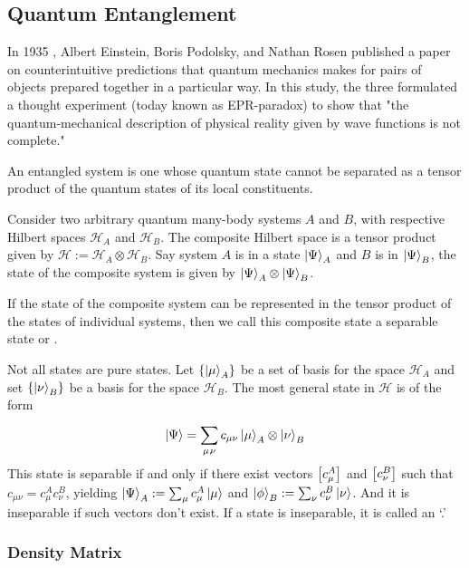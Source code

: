 \documentclass[11pt, oneside]{scrbook}
\renewcommand{\H}{\mathcal{H}}
\begin{document}
\subsection{Quantum Entanglement}

In 1935 \cite{Einstein1935}, Albert Einstein, Boris Podolsky, and Nathan Rosen published a paper on counterintuitive predictions that quantum mechanics makes for pairs of objects prepared together in a particular way. In this study, the three formulated a thought experiment (today known as EPR-paradox) to show that "the quantum-mechanical description of physical reality given by wave functions is not complete."

\begin{definition}
    An entangled system is one whose quantum state cannot be separated as a tensor product of the quantum states of its local constituents.
\end{definition}

Consider two arbitrary quantum many-body systems $A$ and $B$, with respective Hilbert spaces \(\H_{A}\) and \(\H_{B}\). The composite Hilbert space is a tensor product given by \(\H:= \H_{A} \otimes \H_{B}\). Say system \(A\) is in a state \(\ket{\Psi}_A\) and \(B\) is in \(\ket{\Psi}_B\), the state of the composite system is given by \(\ket{\Psi}_A \otimes \ket{\Psi}_B\).
\begin{remark}
    If the state of the composite system can be represented in the tensor product of the states of individual systems, then we call this composite state a separable state or .

    \noindent Not all states are pure states. Let \(\qty{\ket{\mu}_A}\) be a set of basis for the space \(\H_A\) and set \(\qty{\ket{\nu}_B}\) be a basis for the space \(\H_B\). The most general state in \(\H\) is of the form
    \[
        \ket{\Psi} = \sum_{\mu,\!\nu}^{} c_{\mu \nu} \ket{\mu}_A \otimes \ket{\nu}_B
    \]
    This state is separable if and only if there exist vectors \(\qty[c_{\mu}^{A}]\) and \(\qty[c_{\nu}^{B}]\) such that \(c_{\mu \nu} = c_{\mu}^{A} c_{\nu}^{B}\), yielding \(\ket{\Psi}_A:= \sum_{\mu} c_{\mu}^{A} \ket{\mu}\) and \(\ket{\phi}_B:= \sum_{\nu} c_{\nu}^{B} \ket{\nu}\). And it is inseparable if such vectors don't exist. If a state is inseparable, it is called an `.'
\end{remark}

\subsubsection{Density Matrix}
\end{document}
